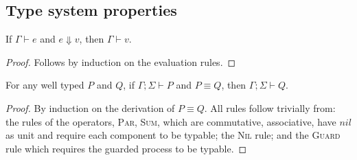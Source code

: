 \subsection{Type system properties}

\begin{theorem}\label{thm:eval_typing}
  If $\Gamma \vdash e$ and $e \Downarrow v$, then $\Gamma \vdash v$.
\end{theorem}
\begin{proof}
  Follows by induction on the evaluation rules.
\end{proof}


\begin{theorem} For any well typed $P$ and $Q$, if $\Gamma; \Sigma \vdash P$ and $P \equiv Q$, then $\Gamma; \Sigma \vdash Q$.
\end{theorem}
\begin{proof}
  
  By induction on the derivation of $P \equiv Q$. All rules follow trivially from: the rules of the operators,
  \textsc{Par}, \textsc{Sum}, which are commutative, associative, have $nil$ as unit and require
  each component to be typable; the \textsc{Nil} rule; and the \textsc{Guard} rule which requires the guarded process
  to be typable.
\end{proof}


